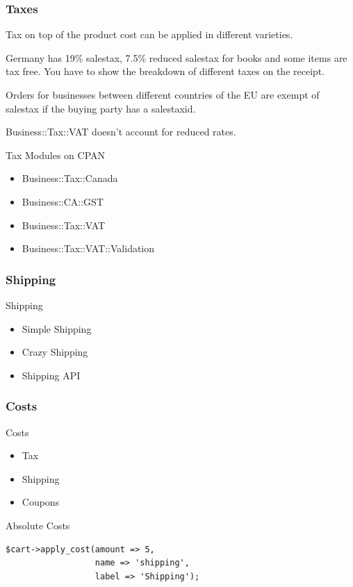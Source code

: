 \subsubsection{Taxes}
Tax on top of the product cost can be applied in different varieties.

Germany has 19\% salestax, 7.5\% reduced salestax for books and some
items are tax free. You have to show the breakdown of different taxes
on the receipt.

Orders for businesses between different countries of the EU are exempt
of salestax if the buying party has a salestaxid.

Business::Tax::VAT doesn't account for reduced rates.

\begin{frame}{Tax Modules on CPAN}
\begin{itemize}
\item Business::Tax::Canada
\item Business::CA::GST
\item Business::Tax::VAT
\item Business::Tax::VAT::Validation
\end{itemize}
\end{frame}

\subsubsection{Shipping}
\begin{frame}{Shipping}
\begin{itemize}
\item Simple Shipping
\item Crazy Shipping
\item Shipping API
\end{itemize}
\end{frame}

\subsubsection{Costs}
\begin{frame}{Costs}
\begin{itemize}
\item Tax
\item Shipping
\item Coupons
\end{itemize}
\end{frame}

\begin{frame}[fragile]{Absolute Costs}
\begin{lstlisting}
$cart->apply_cost(amount => 5, 
                  name => 'shipping', 
                  label => 'Shipping');
\end{lstlisting}
\end{frame}

